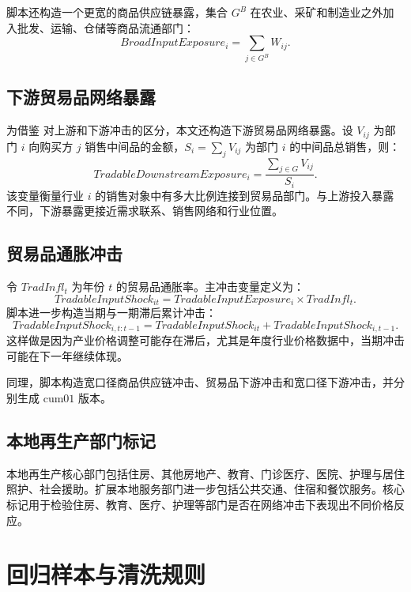 \documentclass[12pt,a4paper,fontset=none]{ctexart}
\begin{document}
脚本还构造一个更宽的商品供应链暴露，集合 \(G^{B}\) 在农业、采矿和制造业之外加入批发、运输、仓储等商品流通部门：
\begin{equation}
BroadInputExposure_i=\sum_{j\in G^{B}}W_{ij}.
\end{equation}

\subsection{下游贸易品网络暴露}

为借鉴 \citet{luo2023propagation} 对上游和下游冲击的区分，本文还构造下游贸易品网络暴露。设 \(V_{ij}\) 为部门 \(i\) 向购买方 \(j\) 销售中间品的金额，\(S_i=\sum_j V_{ij}\) 为部门 \(i\) 的中间品总销售，则：
\begin{equation}
TradableDownstreamExposure_i
=\frac{\sum_{j\in G}V_{ij}}{S_i}.
\end{equation}
该变量衡量行业 \(i\) 的销售对象中有多大比例连接到贸易品部门。与上游投入暴露不同，下游暴露更接近需求联系、销售网络和行业位置。

\subsection{贸易品通胀冲击}

令 \(TradInfl_t\) 为年份 \(t\) 的贸易品通胀率。主冲击变量定义为：
\begin{equation}
TradableInputShock_{it}
=TradableInputExposure_i\times TradInfl_t.
\end{equation}
脚本进一步构造当期与一期滞后累计冲击：
\begin{equation}
TradableInputShock_{i,t:t-1}
=TradableInputShock_{it}+TradableInputShock_{i,t-1}.
\end{equation}
这样做是因为产业价格调整可能存在滞后，尤其是年度行业价格数据中，当期冲击可能在下一年继续体现。

同理，脚本构造宽口径商品供应链冲击、贸易品下游冲击和宽口径下游冲击，并分别生成 \(\text{cum01}\) 版本。

\subsection{本地再生产部门标记}

本地再生产核心部门包括住房、其他房地产、教育、门诊医疗、医院、护理与居住照护、社会援助。扩展本地服务部门进一步包括公共交通、住宿和餐饮服务。核心标记用于检验住房、教育、医疗、护理等部门是否在网络冲击下表现出不同价格反应。

\section{回归样本与清洗规则}
\end{document}
